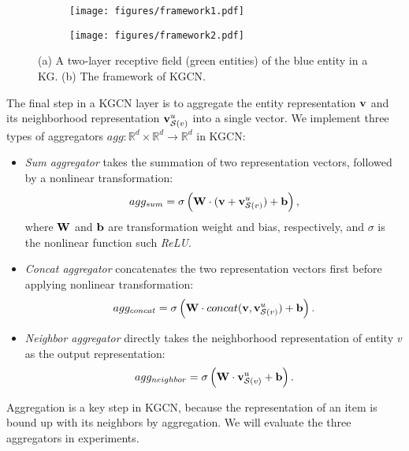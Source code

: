 \documentclass[sigconf]{acmart}
\begin{document}
		\begin{figure}
			\centering
			\begin{subfigure}[b]{0.2\textwidth}
   				\texttt{[image: figures/framework1.pdf]}
   				\caption{}
   				\label{fig:framework1}
			\end{subfigure}
			\hfill
			\begin{subfigure}[b]{0.24\textwidth}
				\texttt{[image: figures/framework2.pdf]}
				\caption{}
				\label{fig:framework2}
			\end{subfigure}
			\caption{(a) A two-layer receptive field (green entities) of the blue entity in a KG. (b) The framework of KGCN.}	
			\label{fig:framework}
		\end{figure}
		
		The final step in a KGCN layer is to aggregate the entity representation $\bf v$ and its neighborhood representation ${\bf v}_{\mathcal S(v)}^u$ into a single vector.
		We implement three types of aggregators $agg: \mathbb R^d \times \mathbb R^d \rightarrow \mathbb R^d$ in KGCN:
		\begin{itemize}
			\item
				\textit{Sum aggregator} takes the summation of two representation vectors, followed by a nonlinear transformation:
				\begin{equation}
					agg_{sum} = \sigma \left( {\bf W} \cdot ({\bf v} + {\bf v}_{\mathcal S(v)}^u) + {\bf b} \right),
				\end{equation}
				where $\bf W$ and $\bf b$ are transformation weight and bias, respectively, and $\sigma$ is the nonlinear function such \textit{ReLU}.
			\item
				\textit{Concat aggregator} \cite{hamilton2017inductive} concatenates the two representation vectors first before applying nonlinear transformation:
				\begin{equation}
					agg_{concat} = \sigma \left( {\bf W} \cdot concat({\bf v}, {\bf v}_{\mathcal S(v)}^u) + {\bf b} \right).
				\end{equation}
			\item
				\textit{Neighbor aggregator} \cite{velickovic2017graph} directly takes the neighborhood representation of entity $v$ as the output representation:
				\begin{equation}
					agg_{neighbor} = \sigma \left( {\bf W} \cdot {\bf v}_{\mathcal S(v)}^u + {\bf b} \right).
				\end{equation}
		\end{itemize}
		Aggregation is a key step in KGCN, because the representation of an item is bound up with its neighbors by aggregation.
		We will evaluate the three aggregators in experiments.
		
\end{document}
